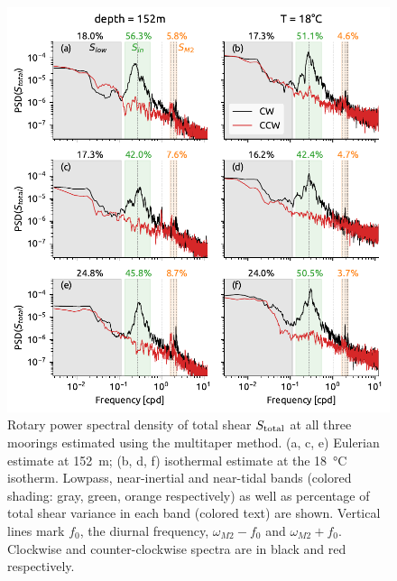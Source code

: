 \documentclass[onecol]{ametsoc}
\begin{document}
\begin{figure}
\centering
\includegraphics[width=33pc]{figure4-nrl-spectra.pdf}
\caption{\label{fig:nrlspectra}
Rotary power spectral density of total shear \(S_\text{total}\) at all three moorings estimated using the multitaper method. (a, c, e) Eulerian estimate at \SI{152}{m}; (b, d, f) isothermal estimate at the \SI{18}{\celsius} isotherm. Lowpass, near-inertial and near-tidal bands (colored shading: gray, green, orange respectively) as well as percentage of total shear variance in each band (colored text) are shown. Vertical lines mark \(f_0\), the diurnal frequency, \(ω_{M2} - f_0\) and \(ω_{M2} + f_0\). Clockwise and counter-clockwise spectra are in black and red respectively.}
\end{figure}
\end{document}
